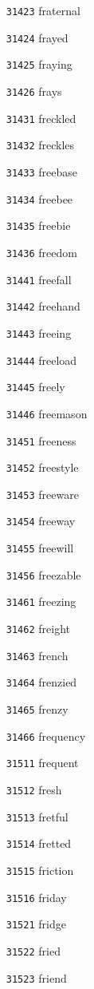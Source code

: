 \documentclass[twoside,11pt]{article}
\begin{document}
\begin{multicols}{5}
\begin{enumerate}
\item[\texttt{31423}] fraternal
\item[\texttt{31424}] frayed
\item[\texttt{31425}] fraying
\item[\texttt{31426}] frays
\item[\texttt{31431}] freckled
\item[\texttt{31432}] freckles
\item[\texttt{31433}] freebase
\item[\texttt{31434}] freebee
\item[\texttt{31435}] freebie
\item[\texttt{31436}] freedom
\item[\texttt{31441}] freefall
\item[\texttt{31442}] freehand
\item[\texttt{31443}] freeing
\item[\texttt{31444}] freeload
\item[\texttt{31445}] freely
\item[\texttt{31446}] freemason
\item[\texttt{31451}] freeness
\item[\texttt{31452}] freestyle
\item[\texttt{31453}] freeware
\item[\texttt{31454}] freeway
\item[\texttt{31455}] freewill
\item[\texttt{31456}] freezable
\item[\texttt{31461}] freezing
\item[\texttt{31462}] freight
\item[\texttt{31463}] french
\item[\texttt{31464}] frenzied
\item[\texttt{31465}] frenzy
\item[\texttt{31466}] frequency
\item[\texttt{31511}] frequent
\item[\texttt{31512}] fresh
\item[\texttt{31513}] fretful
\item[\texttt{31514}] fretted
\item[\texttt{31515}] friction
\item[\texttt{31516}] friday
\item[\texttt{31521}] fridge
\item[\texttt{31522}] fried
\item[\texttt{31523}] friend

\end{enumerate}
\end{multicols}
\end{document}
